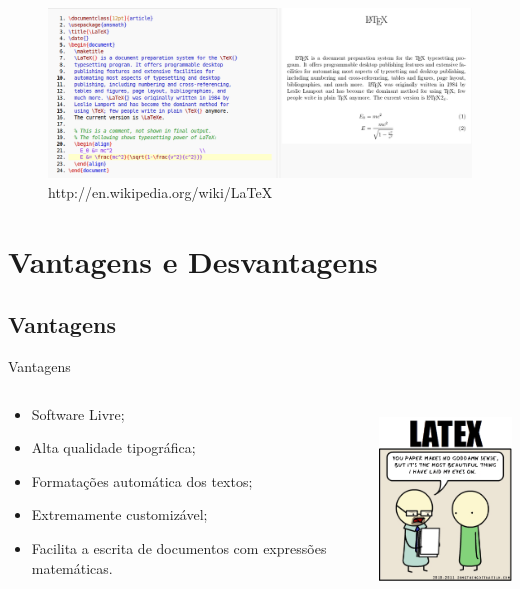 \begin{frame}
\begin{figure}[htbp]
    \centering
        \includegraphics[width=1\textwidth]{figuras/output.png}
    \caption{http://en.wikipedia.org/wiki/LaTeX}
    \label{fig:output}
\end{figure}
\end{frame}

\section{Vantagens e Desvantagens}
\subsection{Vantagens}
\begin{frame}{Vantagens}
\begin{columns}[T]
    \begin{column}[T]{5cm}
        \begin{itemize}
            \item Software Livre;
            \item Alta qualidade tipográfica;
            \item Formatações automática dos textos;
            \item Extremamente customizável;
            \item Facilita a escrita de documentos com expressões matemáticas.
        \end{itemize}
    \end{column}

    \begin{column}[T]{5cm}
        \centering
        \includegraphics[height=5cm]{figuras/135.png}
    \end{column}
\end{columns}
\end{frame}

